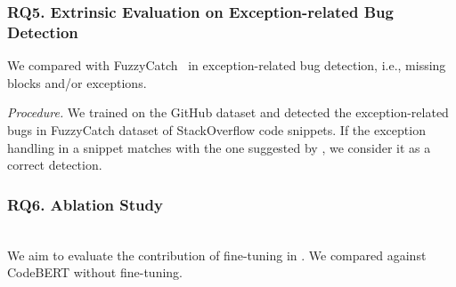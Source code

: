 





%


\subsubsection{RQ5. Extrinsic Evaluation on Exception-related Bug Detection}
 We compared with
FuzzyCatch~\cite{xrank-fse20} in exception-related
bug detection, i.e., missing  blocks and/or exceptions.



{\em Procedure.} We trained {\tool} on the GitHub dataset and detected
the exception-related bugs in FuzzyCatch dataset of StackOverflow
code snippets. If the exception handling in a snippet matches with
the one suggested by {\tool}, we consider it as a correct detection.



\subsubsection{RQ6. Ablation Study}~\\
We aim to evaluate the contribution of fine-tuning in {\tool}. We
compared {\tool} against CodeBERT without fine-tuning.
